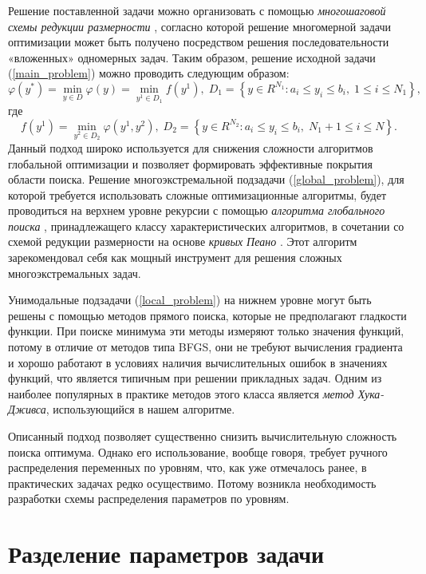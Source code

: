 \documentclass[11pt, oneside, a4paper]{article}
\begin{document}
Решение поставленной задачи можно организовать с помощью \textit{многошаговой схемы редукции размерности} \cite{Grishagin2007}, согласно которой решение многомерной задачи оптимизации может быть получено посредством решения последовательности «вложенных» одномерных задач. Таким образом, решение исходной задачи (\ref{main_problem}) можно проводить следующим образом:
\begin{equation}\label{global_problem}
\varphi(y^*) = \min_{y\in D} \varphi (y) = \min_{y^1\in D_1} f(y^1), \; D_1=\left\{y\in R^{N_1}: 
a_i\leq y_i \leq b_i, \; 1\leq i \leq N_1\right\},
\end{equation}
где 
\begin{equation}\label{local_problem}
f(y^1) = \min_{ y^2 \in D_2} \varphi(y^1,y^2), \; D_2=\left\{y\in R^{N_2}: a_i\leq y_i \leq b_i, \; 
N_1+1\leq i \leq N\right\}. 
\end{equation}
Данный подход широко используется для снижения сложности алгоритмов глобальной оптимизации и позволяет формировать эффективные покрытия области поиска.
Решение  многоэкстремальной подзадачи (\ref{global_problem}), для которой требуется использовать сложные оптимизационные алгоритмы, будет проводиться на верхнем уровне рекурсии с помощью \textit{алгоритма глобального поиска} \cite{Strongin13}, принадлежащего классу характеристических алгоритмов, в сочетании со схемой редукции размерности на основе \textit{кривых Пеано} \cite{Sergeyev2013}. Этот алгоритм зарекомендовал себя как мощный инструмент для решения сложных многоэкстремальных задач.

Унимодальные подзадачи (\ref{local_problem}) на нижнем уровне могут быть решены с помощью методов прямого поиска, которые не предполагают гладкости функции.
При поиске минимума эти методы измеряют только значения функций, потому в отличие от методов типа BFGS, они не требуют вычисления градиента и хорошо работают в условиях наличия вычислительных ошибок в значениях функций, что является типичным при решении прикладных задач. Одним из наиболее популярных в практике методов этого класса является \textit{метод Хука-Дживса}, использующийся в нашем алгоритме. 

Описанный подход позволяет существенно снизить вычислительную сложность поиска оптимума. Однако его использование, вообще говоря, требует ручного распределения переменных по уровням, что, как уже отмечалось ранее, в практических задачах редко осуществимо. Потому возникла необходимость разработки схемы распределения параметров по уровням.

\section{Разделение параметров задачи}
\end{document}
